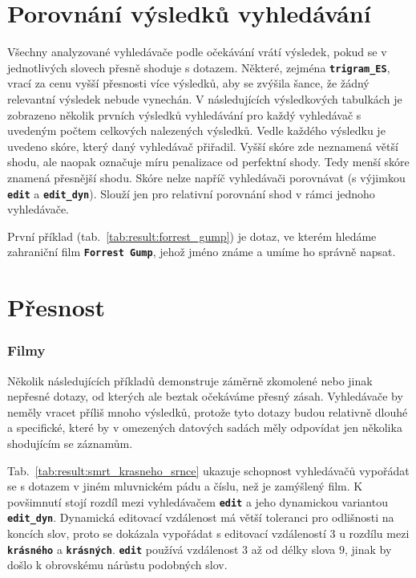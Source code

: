 \documentclass[11pt,letterpaper,oneside,openright]{book}
\newcommand{\bftt}[1]{\texttt{\textbf{#1}}}
\begin{document}
\section{Porovnání výsledků vyhledávání}
Všechny analyzované vyhledávače podle očekávání vrátí výsledek, pokud se v
jednotlivých slovech přesně shoduje s dotazem. Některé, zejména
\bftt{trigram\_ES}, vrací za cenu vyšší přesnosti více výsledků, aby se zvýšila
šance, že žádný relevantní výsledek nebude vynechán.  V následujících
výsledkových tabulkách je zobrazeno několik prvních výsledků vyhledávání pro
každý vyhledávač s uvedeným počtem celkových nalezených výsledků. Vedle každého
výsledku je uvedeno skóre, který daný vyhledávač přiřadil. Vyšší skóre zde
neznamená větší shodu, ale naopak označuje míru penalizace od perfektní shody.
Tedy menší skóre znamená přesnější shodu. Skóre nelze napříč vyhledávači
porovnávat (s výjimkou \bftt{edit} a \bftt{edit\_dyn}). Slouží jen pro
relativní porovnání shod v rámci jednoho vyhledávače.

\mbox{}\mbox{}

První příklad (tab.~\ref{tab:result:forrest_gump}) je dotaz, ve kterém hledáme
zahraniční film \bftt{Forrest Gump}, jehož jméno známe a umíme ho správně
napsat.

\section{Přesnost}
\subsubsection{Filmy}
Několik následujících příkladů demonstruje záměrně zkomolené nebo jinak
nepřesné dotazy, od kterých ale beztak očekáváme přesný zásah.
Vyhledávače by neměly vracet příliš mnoho výsledků, protože tyto dotazy
budou relativně dlouhé a specifické, které by v omezených datových
sadách měly odpovídat jen několika shodujícím se záznamům.

\mbox{}\mbox{}

Tab.~\ref{tab:result:smrt_krasneho_srnce} ukazuje schopnost vyhledávačů
vypořádat se s dotazem v jiném mluvnickém pádu a číslu, než je zamýšlený film.
K povšimnutí stojí rozdíl mezi vyhledávačem \bftt{edit} a jeho dynamickou
variantou \bftt{edit\_dyn}. Dynamická editovací vzdálenost má větší toleranci
pro odlišnosti na koncích slov, proto se dokázala vypořádat s editovací
vzdáleností $3$ u rozdílu mezi \bftt{krásného} a \bftt{krásných}.  \bftt{edit}
používá vzdálenost $3$ až od délky slova $9$, jinak by došlo k obrovskému
nárůstu podobných slov.
\end{document}
